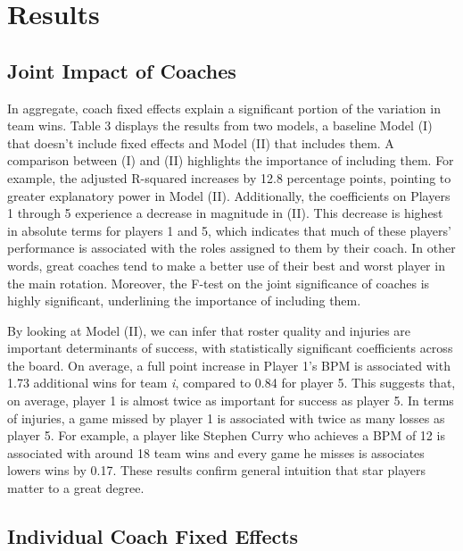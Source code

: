

\section{Results}

\subsection{Joint Impact of Coaches}

In aggregate, coach fixed effects explain a significant portion of the variation in team wins. Table 3 displays the results from two models, a baseline Model (I) that doesn't include fixed effects and Model (II) that includes them. A comparison between (I) and (II) highlights the importance of including them. For example, the adjusted R-squared increases by 12.8 percentage points, pointing to greater explanatory power in Model (II). Additionally, the coefficients on Players 1 through 5 experience a decrease in magnitude in (II). This decrease is highest in absolute terms for players 1 and 5, which indicates that much of these players' performance is associated with the roles assigned to them by their coach. In other words, great coaches tend to make a better use of their best and worst player in the main rotation. Moreover, the F-test on the joint significance of coaches is highly significant, underlining the importance of including them. 

%

By looking at Model (II), we can infer that roster quality and injuries are important determinants of success, with statistically significant coefficients across the board. On average, a full point increase in Player 1's BPM is associated with 1.73 additional wins for team \textit{i}, compared to 0.84 for player 5. This suggests that, on average, player 1 is almost twice as important for success as player 5. In terms of injuries, a game missed by player 1 is associated with twice as many losses as player 5. For example, a player like Stephen Curry who achieves a BPM of 12 is associated with around 18 team wins and every game he misses is associates lowers wins by 0.17. These results confirm general intuition that star players matter to a great degree.

\subsection{Individual Coach Fixed Effects}

